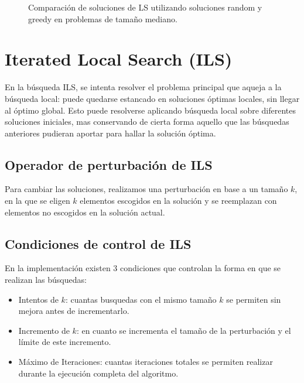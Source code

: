 \documentclass{ci5652}
\begin{document}
\begin{figure}[]
	\setlength\fboxsep{0pt}
	\setlength\fboxrule{0.5pt}
	\caption{Comparación de soluciones de LS utilizando soluciones random y greedy en problemas de tamaño mediano.}
	\label{fig:localsearch-solution-randomgreedy}
\end{figure}

\section{Iterated Local Search (ILS)}
En la búsqueda ILS, se intenta resolver el problema principal que aqueja a la búsqueda local: puede quedarse estancado en soluciones óptimas locales, sin llegar al óptimo global. Esto puede resolverse aplicando búsqueda local sobre diferentes soluciones iniciales, mas conservando de cierta forma aquello que las búsquedas anteriores pudieran aportar para hallar la solución óptima.

\subsection{Operador de perturbación de ILS}
Para cambiar las soluciones, realizamos una perturbación en base a un tamaño $k$, en la que se eligen $k$ elementos escogidos en la solución y se reemplazan con elementos no escogidos en la solución actual.

\subsection{Condiciones de control de ILS}
En la implementación existen 3 condiciones que controlan la forma en que se realizan las búsquedas:
\begin{itemize} \itemsep5pt
	\item Intentos de $k$: cuantas busquedas con el mismo tamaño $k$ se permiten sin mejora antes de incrementarlo.
	\item Incremento de $k$: en cuanto se incrementa el tamaño de la perturbación y el límite de este incremento.
	\item Máximo de Iteraciones: cuantas iteraciones totales se permiten realizar durante la ejecución completa del algoritmo.
\end{itemize}
\end{document}
